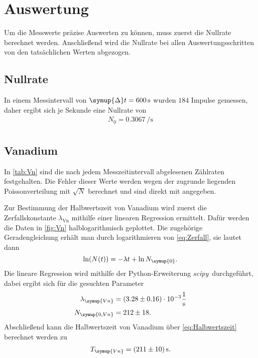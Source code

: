 \section{Auswertung}
\label{sec:Auswertung}

Um die Messwerte präzise Auswerten zu können, muss zuerst die Nullrate berechnet werden.
Anschließend wird die Nullrate bei allen Auswertungsschritten von den tatsächlichen Werten abgezogen.

\subsection{Nullrate}

In einem Messintervall von $\symup{\Delta}t=\qty{600}{\second}$ wurden $184$ Impulse gemessen, daher
ergibt sich je Sekunde eine Nullrate von
\begin{gather*}
    N_0=\qty{0.3067}{\per\second} \\
\end{gather*}

\subsection{Vanadium}

In \autoref{tab:Vn} sind die nach jedem Messzeitintervall abgelesenen Zählraten festgehalten.
Die Fehler dieser Werte werden wegen der zugrunde liegenden Poissonverteilung mit $\sqrt{N}$ berechnet und sind
direkt mit angegeben.

Zur Bestimmung der Halbwertszeit von Vanadium wird zuerst die Zerfallskonstante $\lambda_\text{Vn}$ mithilfe einer linearen Regression
ermittelt.
Dafür werden die Daten in \autoref{fig:Vn} halblogarithmisch geplottet.
Die zugehörige Geradengleichung erhält man durch logarithmieren von \eqref{eq:Zerfall}, sie lautet dann
\begin{equation*}
  \ln(N(t)) = -\lambda t + \ln{N_{\symup{0}}}.
\end{equation*}
Die lineare Regression wird mithilfe der Python-Erweiterung \textit{scipy}\,\cite{scipy} durchgeführt, dabei
ergibt sich für die gesuchten Parameter
\begin{align*}
  \lambda_{\symup{Vn}} &= (3.28 \pm 0.16) \cdot 10^{-3} \unit{\per\second} \\
  N_{\symup{0, Vn}} &= 212 \pm 18.
\end{align*}
Abschließend kann die Halbwertszeit von Vanadium über \eqref{eq:Halbwertszeit} berechnet werden zu
\begin{gather*}
  T_{\symup{Vn}} = \qty{211+-10}{\second}.
\end{gather*}

